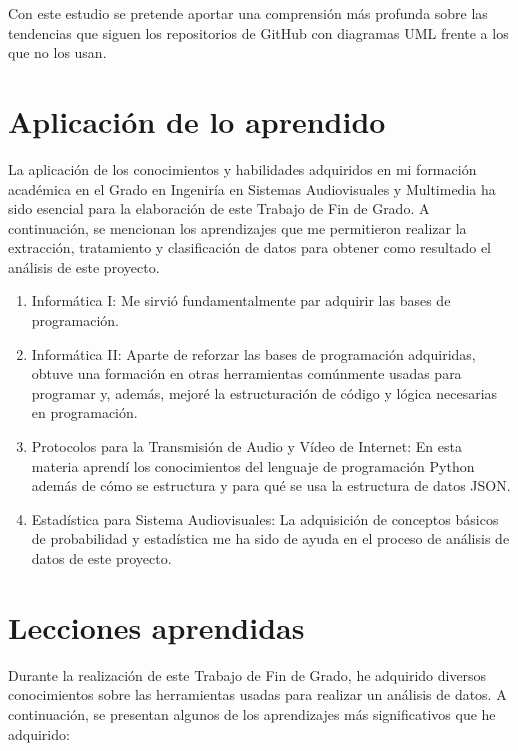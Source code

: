 \documentclass[a4paper, 12pt]{book}
\begin{document}
Con este estudio se pretende aportar una comprensión más profunda sobre las tendencias que siguen los repositorios de GitHub con diagramas UML frente a los que no los usan.


\section{Aplicación de lo aprendido}
\label{sec:aplicacion}

La aplicación de los conocimientos y habilidades adquiridos en mi formación académica en el Grado en Ingeniría en Sistemas Audiovisuales y Multimedia ha sido esencial para la elaboración de este Trabajo de Fin de Grado.
A continuación, se mencionan los aprendizajes que me permitieron realizar la extracción, tratamiento y clasificación de datos para obtener como resultado el análisis de este proyecto. 

\begin{enumerate}
  \item Informática I: Me sirvió fundamentalmente par adquirir las bases de programación.
  \item Informática II: Aparte de reforzar las bases de programación adquiridas, obtuve una formación en otras herramientas comúnmente usadas para programar y, además, mejoré la estructuración de código y lógica necesarias en programación.
  \item Protocolos para la Transmisión de Audio y Vídeo de Internet: En esta materia aprendí los conocimientos del lenguaje de programación Python además de cómo se estructura y para qué se usa la estructura de datos JSON.
  \item Estadística para Sistema Audiovisuales: La adquisición de conceptos básicos de probabilidad y estadística me ha sido de ayuda en el proceso de análisis de datos de este proyecto. 
\end{enumerate}


\section{Lecciones aprendidas}
\label{sec:lecciones_aprendidas}

Durante la realización de este Trabajo de Fin de Grado, he adquirido diversos conocimientos sobre las herramientas usadas para realizar un análisis de datos. 
A continuación, se presentan algunos de los aprendizajes más significativos que he adquirido:
\end{document}

